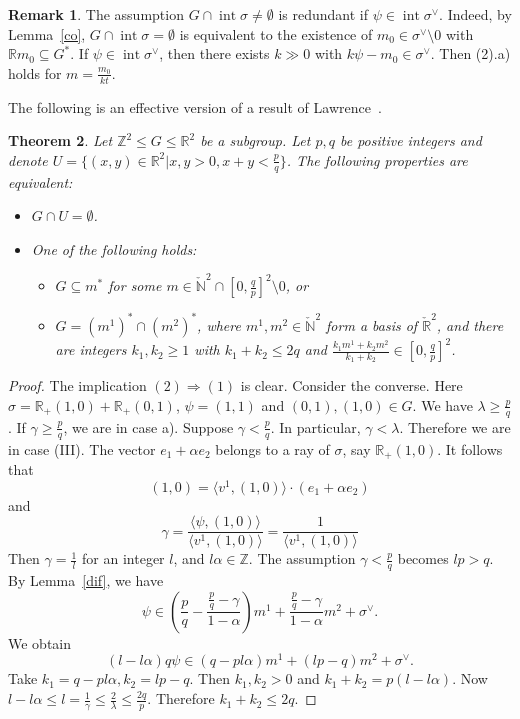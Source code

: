 \documentclass[12pt,reqno]{amsart}
\newcommand{\Z}{{\mathbb Z}}
\newcommand{\N}{{\mathbb N}}
\newcommand{\R}{{\mathbb R}}
\newcommand{\Int}{\operatorname{int}}
\theoremstyle{plain}
\newtheorem{thm}{Theorem}[section]
\theoremstyle{definition}
\newtheorem{rem}[thm]{Remark}
\theoremstyle{remark}
\begin{document}
\begin{rem}
The assumption $G\cap \Int \sigma \ne \emptyset$ is redundant if
$\psi\in \Int \sigma^\vee$. Indeed, by Lemma~\ref{co},
$G\cap \Int \sigma=\emptyset$ is equivalent to the existence
of $m_0\in \sigma^\vee\setminus 0$ with $\R m_0\subseteq G^*$.
If $\psi\in \Int \sigma^\vee$, then there exists $k\gg 0$
with $k\psi-m_0\in \sigma^\vee$. Then (2).a) holds for $m=\frac{m_0}{kt}$.
\end{rem}

The following is an effective version of a result of Lawrence~\cite{Law91}.

\begin{thm}\label{Lawr}
Let $\Z^2\le G\le \R^2$ be a subgroup.
Let $p,q$ be positive integers and denote
$U=\{(x,y)\in \R^2 \vert x,y>0,x+y<\frac{p}{q}\}$. 
The following properties are equivalent:
\begin{itemize}
\item[(1)] $G\cap U=\emptyset$.
\item[(2)] One of the following holds:
\begin{itemize}
\item[a)] $G\subseteq m^*$ for some 
$m\in \check{\N}^2\cap [0,\frac{q}{p}]^2\setminus 0$, or
\item[b)] $G=(m^1)^*\cap(m^2)^*$, where $m^1,m^2\in \check{\N}^2$ form a 
basis of $\check{\R}^2$, and there are integers $k_1,k_2\ge 1$
with $k_1+k_2\le 2q$ and $\frac{k_1m^1+k_2m^2}{k_1+k_2}\in [0,\frac{q}{p}]^2$.
\end{itemize}
\end{itemize}
\end{thm}

\begin{proof}
The implication $(2)\Longrightarrow (1)$ is clear.
Consider the converse. Here $\sigma=\R_+(1,0)+\R_+(0,1)$, 
$\psi=(1,1)$ and $(0,1),(1,0)\in G$.
We have $\lambda\ge \frac{p}{q}$.
If $\gamma\ge \frac{p}{q}$, we are in case a). Suppose 
$\gamma<\frac{p}{q}$. In particular, $\gamma<\lambda$.
Therefore we are in case (III).
The vector $e_1+\alpha e_2$ belongs
to a ray of $\sigma$, say $\R_+(1,0)$. 
It follows that 
$$
(1,0)=\langle v^1,(1,0)\rangle \cdot (e_1+\alpha e_2)
$$
and 
$$
\gamma=\frac{\langle \psi,(1,0)\rangle}{\langle v^1,(1,0)\rangle}=\frac{1}{\langle v^1,(1,0)\rangle}
$$
Then $\gamma=\frac{1}{l}$ for an integer $l$, and $l\alpha\in \Z$. 
The assumption $\gamma<\frac{p}{q}$ becomes $lp>q$. By Lemma~\ref{dif},
we have 
$$
\psi\in (\frac{p}{q}-\frac{\frac{p}{q}-\gamma}{1-\alpha})m^1+
\frac{\frac{p}{q}-\gamma}{1-\alpha} m^2+\sigma^\vee.
$$
We obtain
$$
(l-l\alpha)q\psi\in (q-pl\alpha)m^1+(lp-q)m^2+\sigma^\vee.
$$
Take $k_1=q-pl\alpha,k_2=lp-q$. Then $k_1,k_2>0$ and 
$k_1+k_2=p(l-l\alpha)$. Now $l-l\alpha\le l=\frac{1}{\gamma}
\le \frac{2}{\lambda}\le \frac{2q}{p}$. Therefore
$k_1+k_2\le 2q$. 
\end{proof}
\end{document}
